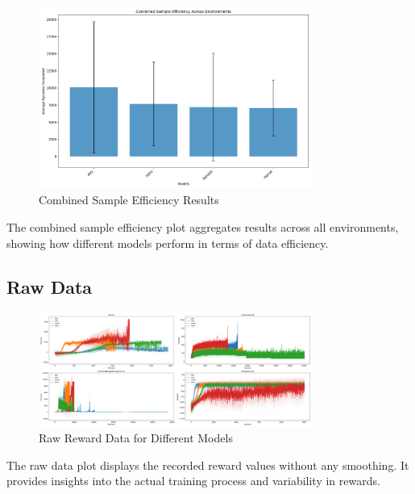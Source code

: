 \documentclass{article}
\begin{document}
\begin{figure}[H]
    \centering
    \includegraphics[width=0.8\textwidth]{.assets/sample_efficiency_combined.png}
    \caption{Combined Sample Efficiency Results}
\end{figure}

The combined sample efficiency plot aggregates results across all environments, showing how different models perform in terms of data efficiency.

\subsection*{Raw Data}

\begin{figure}[H]
    \centering
    \includegraphics[width=0.8\textwidth]{.assets/raw_data.png}
    \caption{Raw Reward Data for Different Models}
\end{figure}

The raw data plot displays the recorded reward values without any smoothing. It provides insights into the actual training process and variability in rewards.

\newpage



\end{document}
